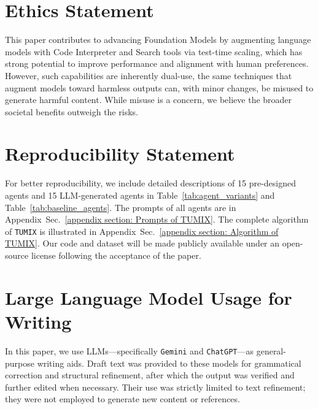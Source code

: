 \section*{Ethics Statement}
This paper contributes to advancing Foundation Models by augmenting language models with Code Interpreter and Search tools via test-time scaling, which has strong potential to improve performance and alignment with human preferences. However, such capabilities are inherently dual-use, the same techniques that augment models toward harmless outputs can, with minor changes, be misused to generate harmful content. While misuse is a concern, we believe the broader societal benefits outweigh the risks.

\section*{Reproducibility Statement} For better reproducibility, we include detailed descriptions of 15 pre-designed agents and 15 LLM-generated agents in Table~\ref{tab:agent_variants} and Table~\ref{tab:baseline_agents}. The prompts of all agents are in Appendix~Sec.~\ref{appendix section: Prompts of TUMIX}. The complete algorithm of \texttt{TUMIX} is illustrated in Appendix~Sec.~\ref{appendix section: Algorithm of TUMIX}. Our code and dataset will be made publicly available under an open-source license following the acceptance of the paper.

\section*{Large Language Model Usage for Writing}\quad
In this paper, we use LLMs---specifically \texttt{Gemini} and \texttt{ChatGPT}---as general-purpose writing aids. Draft text was provided to these models for grammatical correction and structural refinement, after which the output was verified and further edited when necessary. Their use was strictly limited to text refinement; they were not employed to generate new content or references.